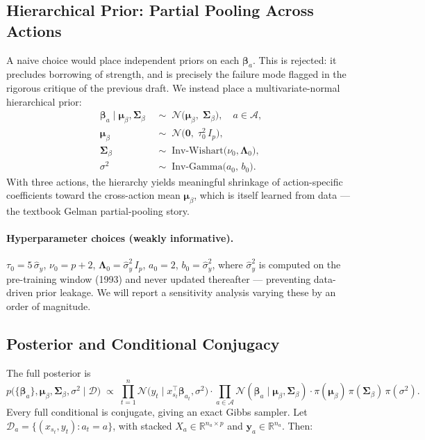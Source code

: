 \documentclass[11pt]{article}
\newcommand{\R}{\mathbb{R}}
\newcommand{\D}{\mathcal{D}}
\newcommand{\N}{\mathcal{N}}
\newcommand{\IG}{\mathrm{Inv\text{-}Gamma}}
\newcommand{\IW}{\mathrm{Inv\text{-}Wishart}}
\begin{document}
\subsection{Hierarchical Prior: Partial Pooling Across Actions}
\label{sec:prior}

A naive choice would place independent priors on each $\bm{\beta}_a$. This is rejected: it precludes borrowing of strength, and is precisely the failure mode flagged in the rigorous critique of the previous draft. We instead place a multivariate-normal hierarchical prior:
\begin{align}
\bm{\beta}_a \mid \bm{\mu}_\beta, \bm{\Sigma}_\beta &\;\sim\; \N\!\big(\bm{\mu}_\beta,\; \bm{\Sigma}_\beta\big), \quad a \in \mathcal{A}, \label{eq:prior-beta}\\
\bm{\mu}_\beta &\;\sim\; \N\!\big(\bm 0,\; \tau_0^2\, I_p\big), \\
\bm{\Sigma}_\beta &\;\sim\; \IW\!\big(\nu_0, \bm\Lambda_0\big), \\
\sigma^2 &\;\sim\; \IG\!\big(a_0,\, b_0\big).
\end{align}
With three actions, the hierarchy yields meaningful shrinkage of action-specific coefficients toward the cross-action mean $\bm{\mu}_\beta$, which is itself learned from data --- the textbook Gelman partial-pooling story.

\paragraph{Hyperparameter choices (weakly informative).} $\tau_0 = 5\,\hat\sigma_y$, $\nu_0 = p+2$, $\bm\Lambda_0 = \hat\sigma_y^2\, I_p$, $a_0 = 2$, $b_0 = \hat\sigma_y^2$, where $\hat\sigma_y^2$ is computed on the pre-training window (1993) and never updated thereafter --- preventing data-driven prior leakage. We will report a sensitivity analysis varying these by an order of magnitude.

\subsection{Posterior and Conditional Conjugacy}
\label{sec:posterior}

The full posterior is
\begin{equation}
\label{eq:posterior}
p\!\big(\{\bm\beta_a\}, \bm\mu_\beta, \bm\Sigma_\beta, \sigma^2 \mid \D\big) \;\propto\; \prod_{t=1}^n \N\!\big(y_t \mid x_{s_t}^\top \bm\beta_{a_t}, \sigma^2\big) \cdot \prod_{a\in\mathcal{A}} \N(\bm\beta_a \mid \bm\mu_\beta, \bm\Sigma_\beta) \cdot \pi(\bm\mu_\beta)\,\pi(\bm\Sigma_\beta)\,\pi(\sigma^2).
\end{equation}
Every full conditional is conjugate, giving an exact Gibbs sampler. Let $\D_a = \{(x_{s_t}, y_t) : a_t = a\}$, with stacked $X_a \in \R^{n_a \times p}$ and $\bm y_a \in \R^{n_a}$. Then:
\end{document}
